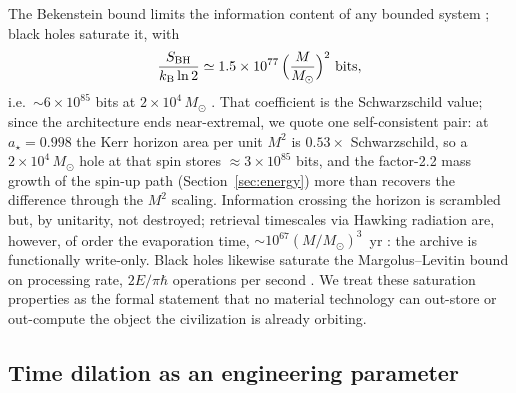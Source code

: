 \documentclass[11pt]{article}
\newcommand{\msun}{\ensuremath{M_\odot}}
\newcommand{\astar}{\ensuremath{a_\star}}
\newcommand{\kb}{\ensuremath{k_{\mathrm{B}}}}
\begin{document}
The Bekenstein bound limits the information content of any bounded system \citep{Bekenstein1981,Casini2008}; black holes saturate it, with
\begin{equation}
\frac{S_{\mathrm{BH}}}{\kb \ln 2} \simeq 1.5\times10^{77}\,\Bigl(\frac{M}{\msun}\Bigr)^{2}\ \mathrm{bits},
\end{equation}
i.e.\ $\sim 6\times10^{85}$ bits at $2\times10^{4}\,\msun$ \citep{Bekenstein1973,Hawking1975,Lloyd2000}. That coefficient is the Schwarzschild value; since the architecture ends near-extremal, we quote one self-consistent pair: at $\astar = 0.998$ the Kerr horizon area per unit $M^{2}$ is $0.53\times$ Schwarzschild, so a $2\times10^{4}\,\msun$ hole at that spin stores $\approx 3\times10^{85}$ bits, and the factor-2.2 mass growth of the spin-up path (Section~\ref{sec:energy}) more than recovers the difference through the $M^{2}$ scaling. Information crossing the horizon is scrambled but, by unitarity, not destroyed; retrieval timescales via Hawking radiation are, however, of order the evaporation time, $\sim 10^{67}(M/\msun)^{3}$~yr \citep{Page1976}: the archive is functionally write-only. Black holes likewise saturate the Margolus--Levitin bound on processing rate, $2E/\pi\hbar$ operations per second \citep{MargolusLevitin1998,Lloyd2000}. We treat these saturation properties as the formal statement that no material technology can out-store or out-compute the object the civilization is already orbiting.

\subsection{Time dilation as an engineering parameter}
\label{sec:dilation}
\end{document}
